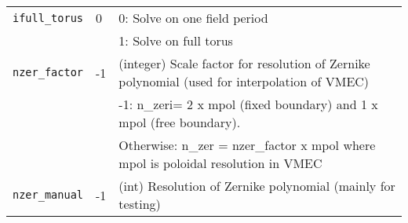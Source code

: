\begin{tabular}{llp{4.5in}}
 \texttt{ifull\_torus}            & 0 & 0:  Solve on one field period \\
                                  &   & 1:  Solve on full torus \\
 \texttt{nzer\_factor}            & -1& (integer) Scale factor for resolution of Zernike polynomial
                                                  (used for interpolation of VMEC) \\
                                  &   &-1: n\_zeri= 2 x mpol (fixed boundary) and 1 x mpol (free boundary). \\
                                  &   &Otherwise: n\_zer = nzer\_factor x mpol where mpol is poloidal resolution in VMEC \\
 \texttt{nzer\_manual}            & -1&(int) Resolution of Zernike polynomial (mainly for testing)

\end{tabular}
